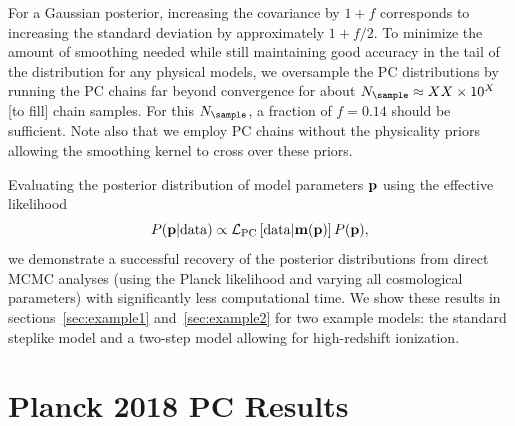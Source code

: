 \documentclass[prd,twocolumn,amsmath,amssymb,floatfix,superscriptaddress,nofootinbib]{revtex4-1}
\begin{document}
For a Gaussian posterior, increasing the covariance by $1+f$ corresponds to increasing the standard deviation by approximately $1+f/2$. To minimize the amount of smoothing needed while still maintaining good accuracy in the tail of the distribution for any physical models, we oversample the PC distributions by running the PC chains far beyond convergence for about $N_{\sample} \approx XX \times 10^{X}$ [to fill] chain samples. For this $N_{\sample}$, a fraction of $f = 0.14$ should be sufficient. Note also that we employ PC chains without the physicality priors allowing the smoothing kernel to cross over these priors. 

Evaluating the posterior distribution of model parameters $\bf p$ using the effective likelihood
\begin{equation}
P({\bf p}| {\rm data}) \propto {\cal L}_{\rm PC}\left[ {\rm data}|\mathbf{m}(\bf p) \right] P(\bf p),
\end{equation}
we demonstrate a successful recovery of the posterior distributions from direct MCMC analyses (using the Planck likelihood and varying all cosmological parameters) with significantly less computational time. We show these results in sections~\ref{sec:example1} and~\ref{sec:example2} for two example models: the standard steplike model and a two-step model allowing for high-redshift ionization. 






\section{Planck 2018 PC Results}
\label{sec:results}
\end{document}
